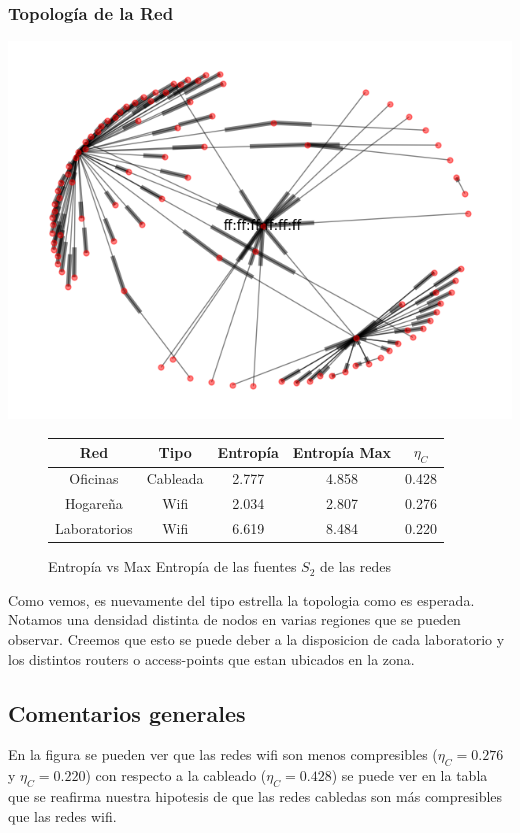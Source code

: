 \subsubsection{Topolog\'ia de la Red}
\begin{center}
 \includegraphics[scale=0.6]{../plots/labos_s2_topologia.png}
\end{center}
\begin{figure}
	\centering
	\begin{tabular}{|c|c|c|c|c|}
		\hline
		Red & Tipo & Entropía & Entropía Max & $\eta_{C}$ \\
		\hline
		Oficinas & Cableada & 2.777 & 4.858 & 0.428 \\
		\hline
		Hogareña & Wifi & 2.034 & 2.807 & 0.276 \\
		\hline
		Laboratorios & Wifi & 6.619 & 8.484 & 0.220 \\
		\hline
	\end{tabular}
	\caption[fig:tabla]{Entropía vs Max Entropía de las fuentes $S_2$ de las redes}
\end{figure}

Como vemos, es nuevamente del tipo estrella la topologia como es esperada. Notamos una densidad
distinta de nodos en varias regiones que se pueden observar. Creemos que esto se puede deber
a la disposicion de cada laboratorio y los distintos routers o access-points que estan ubicados en la zona.


\subsection{Comentarios generales}

En la figura \label{fig:tabla} se pueden ver que las redes wifi son menos compresibles ($\eta_{C}=0.276$ y $\eta_{C}=0.220$)
con respecto a la cableado ($\eta_{C}=0.428$) se puede ver en la tabla que se
reafirma nuestra hipotesis de que las redes cabledas son más compresibles que
las redes wifi.
